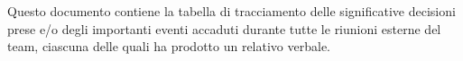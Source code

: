 Questo documento contiene la tabella di tracciamento delle significative decisioni prese e/o degli importanti eventi accaduti durante tutte le riunioni esterne del team, ciascuna delle quali ha prodotto un relativo verbale.